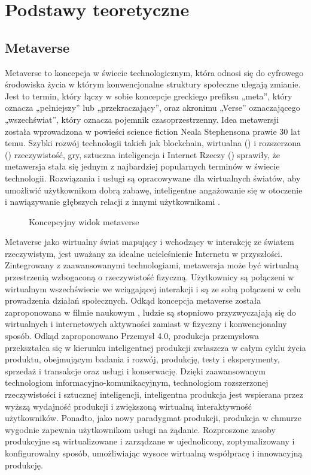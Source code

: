 
\chapter{Podstawy teoretyczne}
\section{Metaverse}


Metaverse to koncepcja w świecie technologicznym, która odnosi się do cyfrowego środowiska życia w którym konwencjonalne struktury społeczne ulegają zmianie. Jest to termin, który łączy w sobie koncepcje greckiego prefiksu „meta”, który oznacza „pełniejszy” lub „przekraczający”, oraz akronimu „Verse” oznaczającego „wszechświat”, który oznacza pojemnik czasoprzestrzenny. Idea metawersji została wprowadzona w powieści science fiction Neala Stephensona  prawie 30 lat temu. Szybki rozwój technologii takich jak blockchain, wirtualna () i rozszerzona () rzeczywistość, gry, sztuczna inteligencja i Internet Rzeczy  () sprawiły, że metawersja stała się jednym z najbardziej popularnych terminów w świecie technologii. Rozwiązania i usługi są opracowywane dla wirtualnych światów, aby umożliwić użytkownikom dobrą zabawę, inteligentne angażowanie się w otoczenie i nawiązywanie głębszych relacji z innymi użytkownikami \cite{metaverseAsAService}. 

\begin{figure}[h!]
    \centering
    
    \caption{Koncepcyjny widok metaverse\cite{metaverseUseCaseslee}}
    \label{fig:enter-label}
\end{figure}

Metaverse jako wirtualny świat mapujący i wchodzący w interakcję ze światem rzeczywistym, jest uważany za idealne ucieleśnienie Internetu w przyszłości. Zintegrowany z zaawansowanymi technologiami, metawersja może być wirtualną przestrzenią wzbogaconą o rzeczywistość fizyczną. Użytkownicy są połączeni w wirtualnym wszechświecie we wciągającej interakcji i są ze sobą połączeni w celu prowadzenia działań społecznych. Odkąd koncepcja metaverse została zaproponowana w filmie naukowym , ludzie są stopniowo przyzwyczajają się do wirtualnych i internetowych aktywności zamiast w fizyczny i konwencjonalny sposób. Odkąd zaproponowano Przemysł 4.0, produkcja przemysłowa przekształca się w kierunku inteligentnej produkcji zwłaszcza w całym cyklu życia produktu, obejmującym badania i rozwój, produkcję, testy i eksperymenty, sprzedaż i transakcje oraz usługi i konserwację. Dzięki zaawansowanym technologiom informacyjno-komunikacyjnym, technologiom rozszerzonej rzeczywistości i sztucznej inteligencji, inteligentna produkcja jest wspierana przez wyższą wydajność produkcji i zwiększoną wirtualną interaktywność użytkowników. Ponadto, jako nowy paradygmat produkcji, produkcja w chmurze wygodnie zapewnia użytkownikom usługi na żądanie. Rozproszone zasoby produkcyjne są wirtualizowane i zarządzane w ujednolicony, zoptymalizowany i konfigurowalny sposób, umożliwiając wysoce wirtualną współpracę i innowacyjną produkcję\cite{industrialMetaverseForSmartManufacturing}. 



